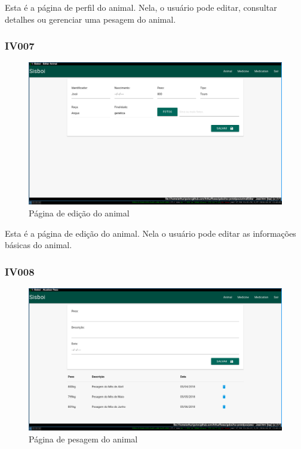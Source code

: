 \documentclass[12pt]{article}
\begin{document}
    Esta é a página de perfil do animal. Nela, o usuário pode editar, consultar detalhes ou gerenciar uma pesagem do animal.

	\newpage

	\subsubsection{IV007}

	\begin{figure}[!h]
		\begin{center}
			\caption{Página de edição do animal}
			\includegraphics[width=13cm]{img/prototipos/editar.png}


		\end{center}
	\end{figure}

	Esta é a página de edição do animal. Nela o usuário pode editar as informações básicas do animal.

	\subsubsection{IV008}

	\begin{figure}[!h]
		\begin{center}
			\caption{Página de pesagem do animal}
			\includegraphics[width=13cm]{img/prototipos/peso.png}


		\end{center}
	\end{figure}
\end{document}

